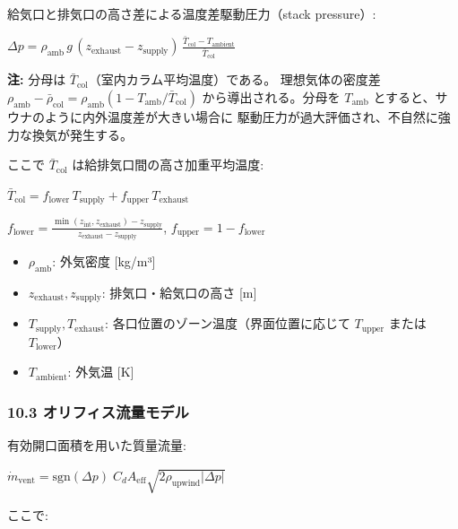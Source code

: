 \documentclass[a4paper,11pt]{article}
\begin{document}
給気口と排気口の高さ差による温度差駆動圧力（stack pressure）:

$
\Delta p = \rho_{\text{amb}} \, g \, (z_{\text{exhaust}} - z_{\text{supply}}) \,
\frac{\bar{T}_{\text{col}} - T_{\text{ambient}}}{\bar{T}_{\text{col}}}
$

\textbf{注:} 分母は $\bar{T}_{\text{col}}$（室内カラム平均温度）である。
理想気体の密度差 $\rho_{\text{amb}} - \bar{\rho}_{\text{col}} = \rho_{\text{amb}}(1 - T_{\text{amb}}/\bar{T}_{\text{col}})$
から導出される。分母を $T_{\text{amb}}$ とすると、サウナのように内外温度差が大きい場合に
駆動圧力が過大評価され、不自然に強力な換気が発生する。

ここで $\bar{T}_{\text{col}}$ は給排気口間の高さ加重平均温度:

$
\bar{T}_{\text{col}} = f_{\text{lower}} \, T_{\text{supply}} + f_{\text{upper}} \, T_{\text{exhaust}}
$

$f_{\text{lower}} = \frac{\min(z_{\text{int}}, z_{\text{exhaust}}) - z_{\text{supply}}}{z_{\text{exhaust}} - z_{\text{supply}}}$, \quad
$f_{\text{upper}} = 1 - f_{\text{lower}}$

\begin{itemize} \item $\rho_{\text{amb}}$: 外気密度 [kg/m³] \end{itemize}
\begin{itemize} \item $z_{\text{exhaust}}, z_{\text{supply}}$: 排気口・給気口の高さ [m] \end{itemize}
\begin{itemize} \item $T_{\text{supply}}, T_{\text{exhaust}}$: 各口位置のゾーン温度（界面位置に応じて $T_{\text{upper}}$ または $T_{\text{lower}}$） \end{itemize}
\begin{itemize} \item $T_{\text{ambient}}$: 外気温 [K] \end{itemize}

\subsubsection{10.3 オリフィス流量モデル}

有効開口面積を用いた質量流量:

$
\dot{m}_{\text{vent}} = \text{sgn}(\Delta p) \; C_d A_{\text{eff}} \sqrt{2 \rho_{\text{upwind}} |\Delta p|}
$

ここで:
\end{document}
